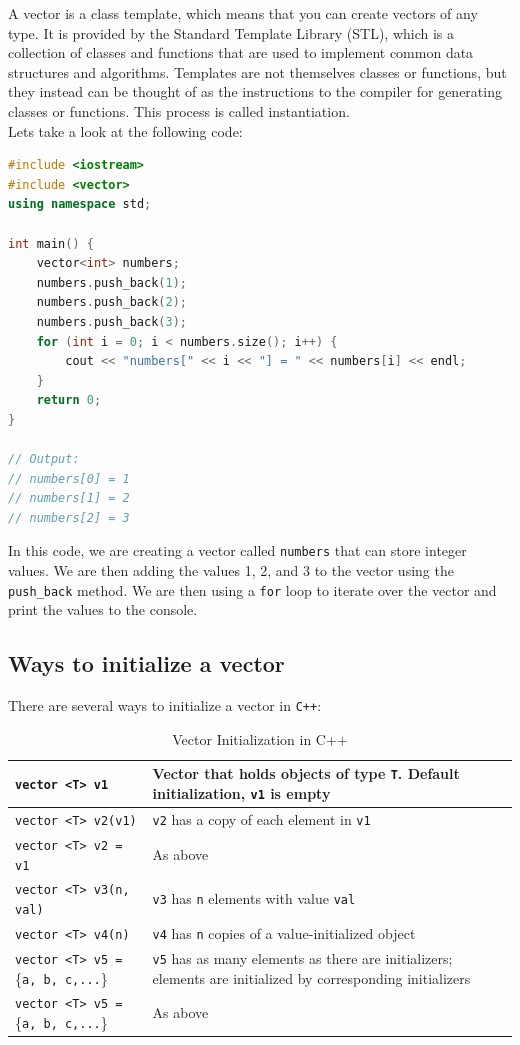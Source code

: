 A vector is a class template, which means that you can create vectors of any type. It is provided by the Standard Template
Library (STL), which is a collection of classes and functions that are used to implement common data structures and algorithms.
Templates are not themselves classes or functions, but they instead can be thought of as the instructions to the compiler for 
generating classes or functions. This process is called instantiation.\\

Lets take a look at the following code:

\begin{lstlisting}[language=C++]
#include <iostream>
#include <vector>
using namespace std;

int main() {
    vector<int> numbers;
    numbers.push_back(1);
    numbers.push_back(2);
    numbers.push_back(3);
    for (int i = 0; i < numbers.size(); i++) {
        cout << "numbers[" << i << "] = " << numbers[i] << endl;
    }
    return 0;
}

// Output:
// numbers[0] = 1
// numbers[1] = 2
// numbers[2] = 3
\end{lstlisting}

In this code, we are creating a vector called \texttt{numbers} that can store integer values. We are then adding the values
1, 2, and 3 to the vector using the \texttt{push\_back} method. We are then using a \texttt{for} loop to iterate over the
vector and print the values to the console.\\

\subsection{Ways to initialize a vector}

There are several ways to initialize a vector in \texttt{C++}:\\

\begin{table}[ht]
\centering
\begin{tabular}{|l|p{7cm}|}
\hline
\texttt{vector <T> v1} & Vector that holds objects of type \texttt{T}. Default initialization, \texttt{v1} is empty \\
\hline
\texttt{vector <T> v2(v1)} & \texttt{v2} has a copy of each element in \texttt{v1} \\
\hline
\texttt{vector <T> v2 = v1} & As above \\
\hline
\texttt{vector <T> v3(n, val)} & \texttt{v3} has \texttt{n} elements with value \texttt{val} \\
\hline
\texttt{vector <T> v4(n)} & \texttt{v4} has \texttt{n} copies of a value-initialized object \\
\hline
\texttt{vector <T> v5 = }\{\texttt{a, b, c,...}\} & \texttt{v5} has as many elements as there are initializers; elements are initialized by corresponding initializers \\
\hline
\texttt{vector <T> v5 = }\{\texttt{a, b, c,...}\} & As above \\
\hline
\end{tabular}
\caption{Vector Initialization in C++}
\label{tab:vector_init}
\end{table}

